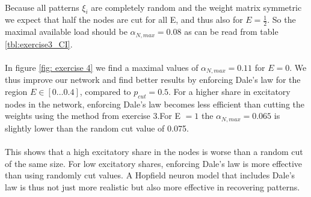 \paragraph*{}
Because all patterns $\xi_i$ are completely random and the weight matrix symmetric we expect that half the nodes are cut for all E, and thus also for $E = \frac{1}{2}$.
So the maximal available load should be $\alpha_{N,max} = 0.08$ as can be read from table \ref{tbl:exercise3_CI}. 

\paragraph*{}
In figure \ref{fig: exercise 4} we find a maximal values of $\alpha_{N,max} = 0.11 $ for $E=0$. We thus improve our network and find better results by enforcing Dale's law for the region $E \in [0 \ldots 0.4]$, compared to $p_{cut} =0.5$. For a higher share in excitatory nodes in the network, enforcing Dale's law becomes less efficient than cutting the weights using the method from exercise 3.For E $ = 1$ the $\alpha_{N,max}=0.065$ is slightly lower than the random cut  value of 0.075.

\paragraph*{}
This shows that a high excitatory share in the nodes is worse than a random cut of the same size. For low excitatory shares, enforcing Dale's law is more effective than using randomly cut values. A Hopfield neuron model that includes Dale's law is thus not just more realistic but also more effective in recovering patterns. 


	